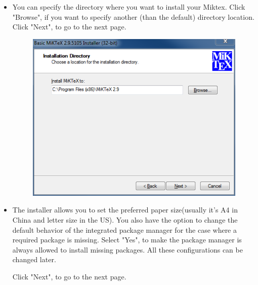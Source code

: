 \documentclass[10pt]{article} %
\begin{document}
\begin{itemize}
  \pagebreak

  \item You can specify the directory where you want to install your Miktex.
  Click "Browse", if you want to specify another (than the default) directory location.
  Click "Next", to go to the next page.

  \begin{figure}[!h]
    \centering
    \includegraphics[width=0.7\linewidth]{figs/basic-miktex-installdir-2-9}
    \caption{}
    \label{fig:basic-miktex-installdir-2-9}
  \end{figure}
  \pagebreak
  \item The installer allows you to set the preferred paper size(usually it's A4 in China and letter size in the US).
  You also have the option to change the default behavior of the integrated package manager for the case where a required package is missing.
  Select "Yes", to make the package manager is always allowed to install missing packages.
  All these configurations can be changed later.

  Click "Next", to go to the next page.


\end{itemize}
\end{document}
